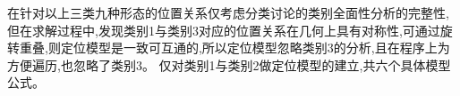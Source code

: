 在针对以上三类九种形态的位置关系仅考虑分类讨论的类别全面性分析的完整性,但在求解过程中,发现类别1与类别3对应的位置关系在几何上具有对称性,可通过旋转重叠,则定位模型是一致可互通的,所以定位模型忽略类别3的分析,且在程序上为方便遍历,也忽略了类别3。
仅对类别1与类别2做定位模型的建立,共六个具体模型公式。

